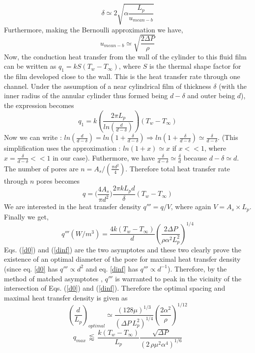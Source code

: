 \documentclass[twocolumn,10pt,cleanfoot]{ihmtc}
\begin{document}
\[\delta \simeq 2\sqrt{\alpha \frac{L_p}{u_{mean-b}}}\]
%
Furthermore, making the Bernoulli approximation we have,
\[u_{mean-b} \simeq \sqrt{\frac{2\Delta P}{\rho }}\]
%
Now, the conduction heat transfer from the wall of the cylinder to this fluid film can be written as $ q_1=k S (T_w-T_\infty)$, where $ S $ is the thermal shape factor for the film developed close to the wall. This is the heat transfer rate through one channel. Under the assumption of a near cylindrical film of thickness $\delta$ (with the inner radius of the annular cylinder thus formed being $d-\delta$ and outer being $d$), the expression becomes
\[q_1=k \left( \frac{2 \pi L_p}{ln\left(\frac{d}{d-\delta}\right)} \right) (T_w-T_\infty) \]
Now we can write : $ln(\frac{d}{d-\delta})=ln(1+\frac{\delta}{d-\delta}) \Rightarrow ln(1+\frac{\delta}{d-\delta}) \simeq \frac{\delta}{d-\delta}$. (This simplification uses the approximation : $ln(1+x) \simeq x$ if $x<<1$, where $x=\frac{\delta}{d-\delta}<<1$ in our case). Futhermore, we have $\frac{\delta}{d-\delta} \simeq\frac{\delta}{d}$ because $d-\delta \simeq d$. The number of pores are $n=A_s/(\frac{\pi d^2}{4})$. Therefore total heat transfer rate through $n$ pores becomes
\[q=\biggl( \frac{4 A_s}{\pi d^2}\biggr) \frac{2 \pi k L_p d}{\delta}(T_w-T_\infty)\]
We are interested in the heat transfer density $q''' = q/V$, where again $V=A_s \times L_p$. Finally we get, 
%
\begin{equation}\label{dinf}
q'''(W/m^3)=\frac{4k (T_w-T_\infty)}{d}\left(\frac{2\Delta P}{\rho\alpha^{2}L_{p}^{2}}\right)^{1/4}
\end{equation}
%
Eqs. (\ref{d0}) and (\ref{dinf}) are the two asymptotes and these two clearly prove the existence of an optimal diameter of the pore for maximal heat transfer density (since eq. \ref{d0} has $q''' \propto d^2$ and eq. \ref{dinf} has $q''' \propto d^{-1}$). Therefore, by the method of matched asymptotes \cite{bejan2004declength}, $q'''$ is warranted to peak in the vicinity of the intersection of Eqs. (\ref{d0}) and (\ref{dinf}). Therefore the optimal spacing and maximal heat transfer density is given as 
%
\begin{equation}
\left(\frac{d}{L_{p}}\right)_{optimal} \simeq \frac{\left(128\mu\right)^{{1}/{3}}}{\left(\Delta P \, L_p^2 \right)^{{1}/{4}}}\left(\frac{2\alpha^{2}}{\rho}\right)^{{1}/{12}}
\end{equation}
%
\begin{equation}
q_{max}\,  \lessapprox \, \frac{k (T_w-T_\infty)}{L_p}\frac{\sqrt{\Delta P}}{(2\, \rho \mu^2 \alpha^4)^{1/6}}
\end{equation}
\end{document}
